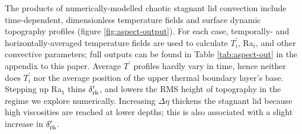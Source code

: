 \documentclass[trackchanges]{aastex63}
\newcommand{\todo}[1]{\textit{\textcolor{violet}{{#1}}}}
\begin{document}
\begin{figure*}

    \caption{Snapshot from a single time step of the dimensionless temperature field \textit{(bottom)}, surface dynamic topography, $h^\prime$ \textit{(top)}, and temperature profile, $T^\prime$ \textit{(right)}, for chaotically time-dependent convection in the stagnant lid regime. This example shows Ra$_1 = 1 \times 10^8$ and $\Delta \eta = 1 \times 10^8$. The dimensionless temperatures range from 0 (cold; blue) to 1 (hot; red). The grey box in the temperature profile shows the instantaneous location and thickness of the upper thermal boundary layer. The vertical scale of $h^\prime$ is exaggerated. 
    \label{fig:aspect-output}}
\end{figure*}

The products of numerically-modelled chaotic stagnant lid convection include time-dependent, dimensionless temperature fields and surface dynamic topography profiles (figure \ref{fig:aspect-output}). For each case, temporally- and horizontally-averaged temperature fields are used to calculate $T_i^\prime$, Ra$_i$, and other convective parameters; full outputs can be found in Table \ref{tab:aspect-out} in the appendix to this paper. Average $T^\prime$ profiles hardly vary in time, hence neither does $T_i^\prime$ nor the average position of the upper thermal boundary layer's base. Stepping up Ra$_1$ thins $\delta_{\rm rh}^\prime$, and lowers the RMS height of topography in the regime we explore numerically. Increasing $\Delta \eta$ thickens the stagnant lid because high viscosities are reached at lower depths; this is also associated with a slight increase in $\delta_{\rm rh}^\prime$. 






\end{document}
